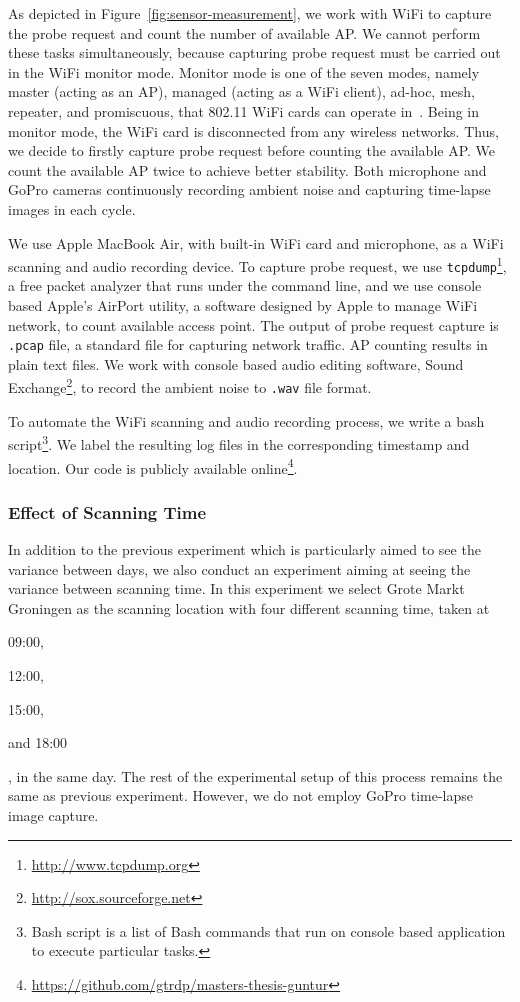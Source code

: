 As depicted in Figure~\ref{fig:sensor-measurement}, we work with WiFi to capture the probe request and count the number of available \ac{AP}. We cannot perform these tasks simultaneously, because capturing probe request must be carried out in the WiFi monitor mode. Monitor mode is one of the seven modes, namely master (acting as an \ac{AP}), managed (acting as a WiFi client), ad-hoc, mesh, repeater, and promiscuous, that 802.11 WiFi cards can operate in~\cite{thesis082}. Being in monitor mode, the WiFi card is disconnected from any wireless networks. Thus, we decide to firstly capture probe request before counting the available \ac{AP}. We count the available \ac{AP} twice to achieve better stability. Both microphone and GoPro cameras continuously recording ambient noise and capturing time-lapse images in each cycle.

We use Apple MacBook Air, with built-in WiFi card and microphone, as a WiFi scanning and audio recording device. To capture probe request, we use \verb|tcpdump|\footnote{\url{http://www.tcpdump.org}}, a free packet analyzer that runs under the command line, and we use console based Apple's AirPort utility, a software designed by Apple to manage WiFi network, to count available access point. The output of probe request capture is \verb|.pcap| file, a standard file for capturing network traffic. \ac{AP} counting results in plain text files. We work with console based audio editing software, Sound Exchange\footnote{\url{http://sox.sourceforge.net}}, to record the ambient noise to \verb|.wav| file format.

To automate the WiFi scanning and audio recording process, we write a bash script\footnote{Bash script is a list of Bash commands that run on console based application to execute particular tasks.}. We label the resulting log files in the corresponding timestamp and location. Our code is publicly available online\footnote{\url{https://github.com/gtrdp/masters-thesis-guntur}}.

\subsubsection{Effect of Scanning Time} %
\label{ssub:effect_of_scanning_time}
In addition to the previous experiment which is particularly aimed to see the variance between days, we also conduct an experiment aiming at seeing the variance between scanning time. In this experiment we select Grote Markt Groningen as the scanning location with four different scanning time, taken at
\begin{enumerate*}[label={\alph*)},font={\color{red!50!black}\bfseries}]
  \item 09:00,
  \item 12:00,
  \item 15:00,
  \item and 18:00
\end{enumerate*},
in the same day. The rest of the experimental setup of this process remains the same as previous experiment. However, we do not employ GoPro time-lapse image capture.








